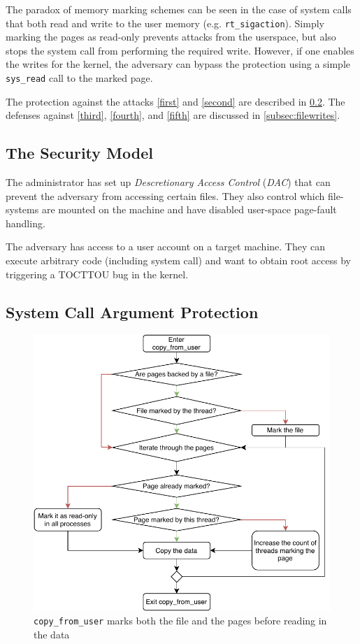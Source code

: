 The paradox of memory marking schemes can be seen in the case of system calls
that both read and write to the user memory (e.g. \texttt{rt\_sigaction}).
Simply marking the pages as read-only prevents attacks from the userspace, but
also stops the system call from performing the required write. However, if one
enables the writes for the kernel, the adversary can bypass the protection
using a simple \texttt{sys\_read} call to the marked page.

The protection against the attacks \ref{first} and \ref{second} are described in
\cref{subsec:memorywrites}. The defenses against \ref{third}, \ref{fourth}, and
\ref{fifth} are discussed in \cref{subsec:filewrites}.


\subsection{The Security Model}
\label{subsec:secmodel}
The administrator has set up \emph{Descretionary Access Control} (\emph{DAC})
that can prevent the adversary from accessing certain files. They also control
which file-systems are mounted on the machine and have disabled user-space
page-fault handling.

The adversary has access to a user account on a target machine. They can execute
arbitrary code (including system call) and want to obtain root access by 
triggering a TOCTTOU bug in the kernel.

\subsection{System Call Argument Protection}

\label{subsec:memorywrites}
\begin{figure}[]
  \centering
  \includegraphics[width = .45 \textwidth]{img/copy_from_user.pdf}
  \caption{\texttt{copy\_from\_user} marks both the file and the pages before
  reading in the data}
  \label{fig:copyfromuser}
\end{figure}

